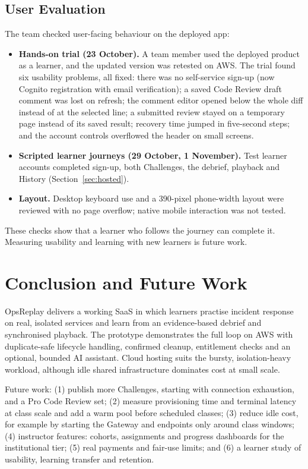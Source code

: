 \documentclass[11pt,a4paper]{article}
\begin{document}
\subsection{User Evaluation}
The team checked user-facing behaviour on the deployed app:
\begin{itemize}
  \item \textbf{Hands-on trial (23 October).} A team member used the deployed
  product as a learner, and the updated version was retested on AWS. The trial
  found six usability problems, all fixed: there was no self-service sign-up
  (now Cognito registration with email verification); a saved Code Review draft
  comment was lost on refresh; the comment editor opened below the whole diff
  instead of at the selected line; a submitted review stayed on a temporary page
  instead of its saved result; recovery time jumped in five-second steps; and
  the account controls overflowed the header on small screens.
  \item \textbf{Scripted learner journeys (29 October, 1 November).} Test learner
  accounts completed sign-up, both Challenges, the debrief, playback and History
  (Section~\ref{sec:hosted}).
  \item \textbf{Layout.} Desktop keyboard use and a 390-pixel phone-width layout
  were reviewed with no page overflow; native mobile interaction was not tested.
\end{itemize}
These checks show that a learner who follows the journey can complete it.
Measuring usability and learning with new learners is future work.

\section{Conclusion and Future Work}
OpsReplay delivers a working SaaS in which learners practise incident response
on real, isolated services and learn from an evidence-based debrief and
synchronised playback. The prototype demonstrates the full loop on AWS with
duplicate-safe lifecycle handling, confirmed cleanup, entitlement checks and an
optional, bounded AI assistant. Cloud hosting suits the bursty, isolation-heavy
workload, although idle shared infrastructure dominates cost at small scale.

Future work: (1) publish more Challenges, starting with connection exhaustion,
and a Pro Code Review set; (2) measure provisioning time and terminal latency
at class scale and add a warm pool before scheduled classes; (3) reduce idle
cost, for example by starting the Gateway and endpoints only around class
windows; (4) instructor features: cohorts, assignments and progress dashboards
for the institutional tier; (5) real payments and fair-use limits; and
(6) a learner study of usability, learning transfer and retention.
\end{document}
